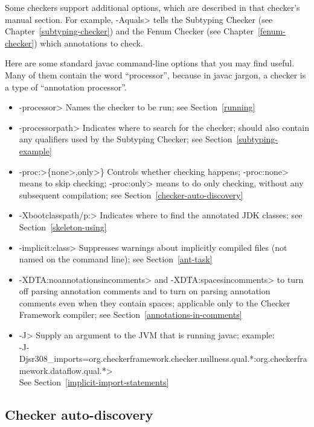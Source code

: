 \noindent
Some checkers support additional options, which are described in that
checker's manual section.
For example, \<-Aquals> tells
the Subtyping Checker (see Chapter~\ref{subtyping-checker}) and the Fenum Checker
(see Chapter~\ref{fenum-checker}) which annotations to check.


Here are some standard javac command-line options that you may find useful.
Many of them contain the word ``processor'', because in javac jargon, a
checker is a type of ``annotation processor''.

\begin{itemize}
\item \<-processor> Names the checker to be
  run; see Section~\ref{running}
\item \<-processorpath> Indicates where to search for the
  checker; should also contain any qualifiers used by the Subtyping
  Checker; see Section~\ref{subtyping-example}
\item \<-proc:>\{\<none>,\<only>\} Controls whether checking
  happens; \<-proc:none>
  means to skip checking; \<-proc:only> means to do only
  checking, without any subsequent compilation; see
  Section~\ref{checker-auto-discovery}
\item \<-Xbootclasspath/p:> Indicates where to find the annotated JDK classes;
  see Section~\ref{skeleton-using}
\item \<-implicit:class> Suppresses warnings about implicitly compiled files
  (not named on the command line); see Section~\ref{ant-task}
\item \<-XDTA:noannotationsincomments> and \<-XDTA:spacesincomments>
  to turn off parsing annotation comments and
  to turn on parsing annotation comments even when they
  contain spaces; applicable only to the Checker Framework compiler;
  see Section~\ref{annotations-in-comments}
\item \<-J> Supply an argument to the JVM that is running javac; example: \\
  \<-J-Djsr308\_imports=org.checkerframework.checker.nullness.qual.*:org.checkerframework.dataflow.qual.*> \\
 See Section~\ref{implicit-import-statements}
\end{itemize}


\subsection{Checker auto-discovery\label{checker-auto-discovery}}

